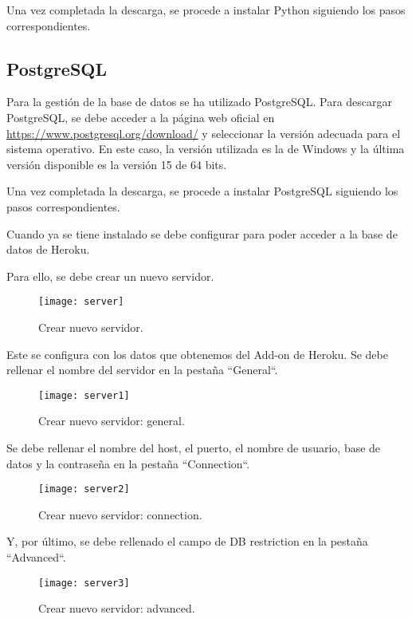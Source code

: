 Una vez completada la descarga, se procede a instalar Python siguiendo los pasos correspondientes.

\subsection{PostgreSQL}
Para la gestión de la base de datos se ha utilizado PostgreSQL. Para descargar PostgreSQL, se debe acceder a la página web oficial en \url{https://www.postgresql.org/download/} y seleccionar la versión adecuada para el sistema operativo. En este caso, la versión utilizada es la de Windows y la última versión disponible es la versión 15 de 64 bits.

Una vez completada la descarga, se procede a instalar PostgreSQL siguiendo los pasos correspondientes.

Cuando ya se tiene instalado se debe configurar para poder acceder a la base de datos de Heroku. 

Para ello, se debe crear un nuevo servidor.
\newpage
    \begin{figure}[htbp]
    \centering
    \texttt{[image: server]}
    \caption{Crear nuevo servidor.}
    \label{fig:server}
    \end{figure}

Este se configura con los datos que obtenemos del Add-on de Heroku. Se debe rellenar el nombre del servidor en la pestaña ``General``.
    \begin{figure}[htbp]
    \centering
    \texttt{[image: server1]}
    \caption{Crear nuevo servidor: general.}
    \label{fig:server1}
    \end{figure}
    
Se debe rellenar el nombre del host, el puerto, el nombre de usuario, base de datos y la contraseña en la pestaña ``Connection``.
\newpage
    \begin{figure}[htbp]
    \centering
    \texttt{[image: server2]}
    \caption{Crear nuevo servidor: connection.}
    \label{fig:server2}
    \end{figure}
    
Y, por último, se debe rellenado el campo de DB restriction en la pestaña ``Advanced``.
    \begin{figure}[htbp]
    \centering
    \texttt{[image: server3]}
    \caption{Crear nuevo servidor: advanced.}
    \label{fig:server3}
    \end{figure}

